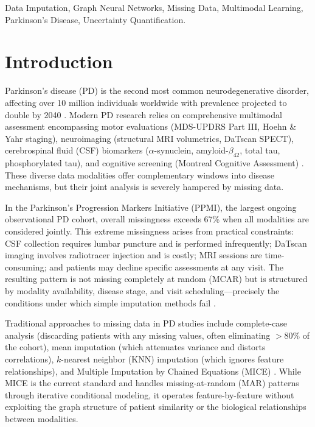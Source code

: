 \documentclass[journal,twoside,web]{ieeecolor}
\begin{document}
\begin{IEEEkeywords}
Data Imputation, Graph Neural Networks, Missing Data, Multimodal Learning, Parkinson's Disease, Uncertainty Quantification.
\end{IEEEkeywords}

\section{Introduction}
\label{sec:introduction}

Parkinson's disease (PD) is the second most common neurodegenerative disorder, affecting over 10 million individuals worldwide with prevalence projected to double by 2040 \cite{dorsey2018global}. Modern PD research relies on comprehensive multimodal assessment encompassing motor evaluations (MDS-UPDRS Part III, Hoehn \& Yahr staging), neuroimaging (structural MRI volumetrics, DaTscan SPECT), cerebrospinal fluid (CSF) biomarkers ($\alpha$-synuclein, amyloid-$\beta_{42}$, total tau, phosphorylated tau), and cognitive screening (Montreal Cognitive Assessment) \cite{marek2011ppmi}. These diverse data modalities offer complementary windows into disease mechanisms, but their joint analysis is severely hampered by missing data.

In the Parkinson's Progression Markers Initiative (PPMI), the largest ongoing observational PD cohort, overall missingness exceeds 67\% when all modalities are considered jointly. This extreme missingness arises from practical constraints: CSF collection requires lumbar puncture and is performed infrequently; DaTscan imaging involves radiotracer injection and is costly; MRI sessions are time-consuming; and patients may decline specific assessments at any visit. The resulting pattern is not missing completely at random (MCAR) but is structured by modality availability, disease stage, and visit scheduling---precisely the conditions under which simple imputation methods fail \cite{little2019statistical}.

Traditional approaches to missing data in PD studies include complete-case analysis (discarding patients with any missing values, often eliminating $>$80\% of the cohort), mean imputation (which attenuates variance and distorts correlations), $k$-nearest neighbor (KNN) imputation (which ignores feature relationships), and Multiple Imputation by Chained Equations (MICE) \cite{vanbuuren2011mice}. While MICE is the current standard and handles missing-at-random (MAR) patterns through iterative conditional modeling, it operates feature-by-feature without exploiting the graph structure of patient similarity or the biological relationships between modalities.
\end{document}
